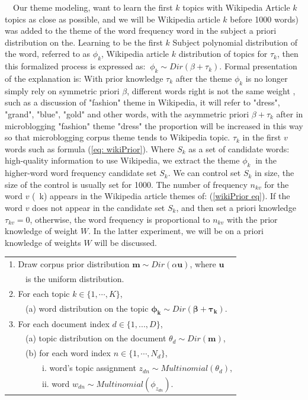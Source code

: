 \documentclass[conference,compsoc]{IEEEtran}
\begin{document}
\ \ Our theme modeling, want to learn the first \(k\) topics with Wikipedia Article \(k\) topics as close as possible, and we will be Wikipedia article \(k\) before 1000 words) was added to the theme of the word frequency word in the subject a priori distribution on the.
Learning to be the first \(k\) Subject polynomial distribution of the word, referred to as \(\phi_k \), Wikipedia article \(k \) distribution of topics for \(\tau_k \), then this formalized process is expressed as: \(\ \phi_k \sim Dir(\beta + \tau_k) \).
Formal presentation of the explanation is: With prior knowledge \(\tau_k \) after the theme \(\phi_k \) is no longer simply rely on symmetric priori \(\beta \), different words right is not the same weight , such as a discussion of "fashion" theme in Wikipedia, it will refer to "dress", "grand", "blue", "gold" and other words, with the asymmetric priori \(\beta + \tau_k \) after in microblogging "fashion" theme "dress" the proportion will be increased in this way so that microblogging corpus theme tends to Wikipedia topic.
\(\tau_k \) in the first \(v \) words such as formula (\ref{eq: wikiPrior}).
Where \(S_k \) as a set of candidate words: high-quality information to use Wikipedia, we extract the theme \(\phi_k \ \) in the higher-word word frequency candidate set \(S_k \).
We can control set \(S_k \) in size, the size of the control is usually set for 1000.
The number of frequency \(n_{kv} \) for the word \(v \) (\ k) appears in the Wikipedia article themes of: (\ref{wikiPrior eq}).
If the word \(v \) does not appear in the candidate set \(S_k \), and then set a priori knowledge \(\tau_{kv} = 0 \), otherwise, the word frequency is proportional to \(n_{kv} \) with the prior knowledge of weight \(W\).
In the latter experiment, we will be on a priori knowledge of weights \(W \) will be discussed. 

\begin{table}[!htbp]
\begin{tabular}{l}
1. Draw corpus prior distribution \(\bm{m} \sim Dir(\alpha \bm{u})\), where \(\bm{u}\)\\
 \ \ \ \ is the uniform distribution. \\
2. For each topic \(k \in \{1,\cdots,K\}\),\\
\ \ \ \ (a) word distribution on the topic \(\bm{\phi_k} \sim Dir(\bm{\beta}+ \bm{\tau_k})\). \\
    
3. For each document index \(d \in \{1,...,D\}\), \\
\ \ \ \ (a) topic distribution on the document \(\theta_d \sim Dir(\bm{m})\), \\
\ \ \ \ (b) for each word index \(n \in \{1,\cdots,N_d\}\),\\
\ \ \ \ \ \ \ \ i. word's topic assignment \(z_{dn} \sim Multinomial(\theta_d)\), \\
\ \ \ \ \ \ \ \ ii. word \(w_{dn} \sim Multinomial(\phi_{z_{dn}})\). \\
\end{tabular}
\end{table}
\end{document}
